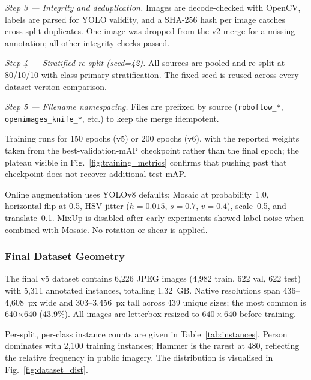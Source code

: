 \documentclass{ieeeaccess}
\begin{document}
\textit{Step 3 --- Integrity and deduplication.} Images are decode-checked with OpenCV, labels are parsed for YOLO validity, and a SHA-256 hash per image catches cross-split duplicates. One image was dropped from the v2 merge for a missing annotation; all other integrity checks passed.

\textit{Step 4 --- Stratified re-split (seed=42).} All sources are pooled and re-split at 80/10/10 with class-primary stratification. The fixed seed is reused across every dataset-version comparison.

\textit{Step 5 --- Filename namespacing.} Files are prefixed by source (\texttt{roboflow\_*}, \texttt{openimages\_knife\_*}, etc.) to keep the merge idempotent.

Training runs for 150 epochs (v5) or 200 epochs (v6), with the reported weights taken from the best-validation-mAP checkpoint rather than the final epoch; the plateau visible in Fig.~\ref{fig:training_metrics} confirms that pushing past that checkpoint does not recover additional test mAP.

Online augmentation uses YOLOv8 defaults: Mosaic at probability~1.0, horizontal flip at 0.5, HSV jitter ($h{=}0.015$, $s{=}0.7$, $v{=}0.4$), scale~0.5, and translate~0.1. MixUp is disabled after early experiments showed label noise when combined with Mosaic. No rotation or shear is applied.

\subsubsection{Final Dataset Geometry}
\label{sec:dataset_geometry}
The final v5 dataset contains 6{,}226 JPEG images (4{,}982 train, 622 val, 622 test) with 5{,}311 annotated instances, totalling 1.32~GB. Native resolutions span 436--4{,}608~px wide and 303--3{,}456~px tall across 439 unique sizes; the most common is 640$\times$640 (43.9\%). All images are letterbox-resized to $640\times640$ before training.

Per-split, per-class instance counts are given in Table~\ref{tab:instances}. Person dominates with 2{,}100 training instances; Hammer is the rarest at 480, reflecting the relative frequency in public imagery. The distribution is visualised in Fig.~\ref{fig:dataset_dist}.
\end{document}
